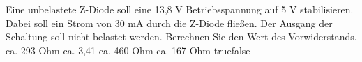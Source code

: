     {Eine unbelastete Z-Diode soll eine 13,8 V Betriebsspannung auf 5 V stabilisieren. Dabei soll ein Strom von 30 mA durch die Z-Diode fließen. Der Ausgang der Schaltung soll nicht belastet werden. Berechnen Sie den Wert des Vorwiderstands.}
    {ca. 293 Ohm}
    {ca. 3,41 \milliOhm}
    {ca. 460 Ohm}
    {ca. 167 Ohm}
    {true}{false}
